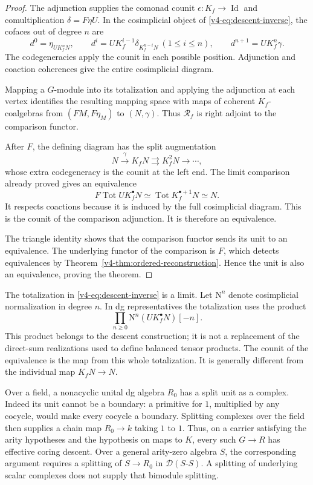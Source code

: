 \begin{proof}
The adjunction supplies the comonad counit
\(\epsilon:K_f\to\operatorname{Id}\) and comultiplication
\(\delta=F\eta U\).
In the cosimplicial object of \eqref{v4-eq:descent-inverse},
the cofaces out of degree \(n\) are
\[
 d^0=\eta_{UK_f^nN},\qquad
 d^i=UK_f^{i-1}\delta_{K_f^{n-i}N}\ (1\leq i\leq n),
 \qquad d^{n+1}=UK_f^n\gamma.
\]
The codegeneracies apply the counit in each possible position.
Adjunction and coaction coherences give the entire cosimplicial
diagram.

Mapping a \(G\)-module into its totalization and applying the
adjunction at each vertex identifies the resulting mapping
space with maps of coherent \(K_f\)-coalgebras from
\((FM,F\eta_M)\) to \((N,\gamma)\).
Thus \(\mathcal R_f\) is right adjoint to the comparison functor.

After \(F\), the defining diagram has the split augmentation
\[
 N\xrightarrow{\gamma}K_fN
 \rightrightarrows K_f^2N\longrightarrow\cdots,
\]
whose extra codegeneracy is the counit at the left end.
The limit comparison already proved gives an equivalence
\[
 F\operatorname{Tot}UK_f^\bullet N
 \simeq \operatorname{Tot}K_f^{\bullet+1}N
 \simeq N .
\]
It respects coactions because it is induced by the full
cosimplicial diagram. This is the counit of the comparison
adjunction. It is therefore an equivalence.

The triangle identity shows that the comparison functor sends
its unit to an equivalence. The underlying functor of the
comparison is \(F\), which detects equivalences by
Theorem~\ref{v4-thm:ordered-reconstruction}.
Hence the unit is also an equivalence, proving the theorem.
\end{proof}

The totalization in \eqref{v4-eq:descent-inverse} is a limit.
Let \(\mathrm N^n\) denote cosimplicial normalization in degree \(n\).
In dg representatives the totalization uses the product
\[
 \prod_{n\geq0}\mathrm N^n(UK_f^\bullet N)[-n].
\]
This product belongs to the descent construction; it is not a
replacement of the direct-sum realizations used to define
balanced tensor products. The counit of the equivalence is the
map from this whole totalization. It is generally different
from the individual map \(K_fN\to N\).

Over a field, a nonacyclic unital dg algebra \(R_0\) has a split
unit as a complex. Indeed its unit cannot be a boundary: a
primitive for \(1\), multiplied by any cocycle, would make
every cocycle a boundary. Splitting complexes over the field
then supplies a chain map \(R_0\to k\) taking \(1\) to \(1\).
Thus, on a carrier satisfying the arity hypotheses and the
hypothesis on maps to \(K\), every such \(G\to R\) has effective
coring descent. Over a general arity-zero algebra \(S\), the
corresponding argument requires a splitting of \(S\to R_0\)
in \(\mathcal D(S\text{-}S)\). A splitting of underlying scalar complexes
does not supply that bimodule splitting.
